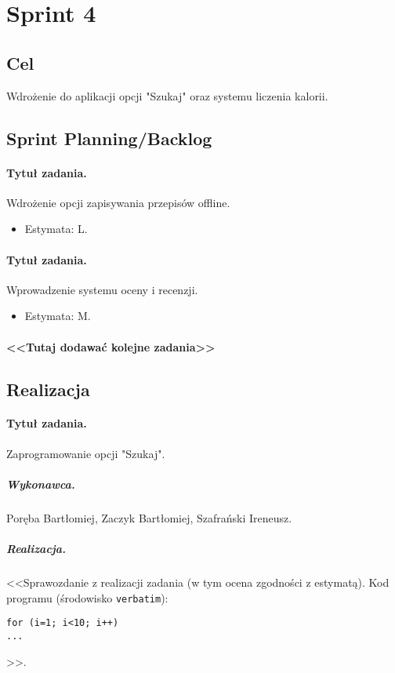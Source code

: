 \documentclass[a4paper]{article}
\begin{document}
\section{Sprint 4}

\subsection{Cel} Wdrożenie do aplikacji opcji "Szukaj" oraz systemu liczenia kalorii.

\subsection{Sprint Planning/Backlog}

\paragraph{Tytuł zadania.} Wdrożenie opcji zapisywania przepisów offline.
\begin{itemize}
	\item Estymata: L.
\end{itemize}

\paragraph{Tytuł zadania.} Wprowadzenie systemu oceny i recenzji.
\begin{itemize}
	\item Estymata: M.
\end{itemize}

\paragraph{<<Tutaj dodawać kolejne zadania>>}

\subsection{Realizacja}

\paragraph{Tytuł zadania.} Zaprogramowanie opcji "Szukaj".
\subparagraph{Wykonawca.} Poręba Bartłomiej, Zaczyk Bartłomiej, Szafrański Ireneusz.
\subparagraph{Realizacja.} <<Sprawozdanie z realizacji zadania (w tym ocena zgodności z estymatą). Kod programu (środowisko \texttt{verbatim}): \begin{verbatim}
for (i=1; i<10; i++)
...
\end{verbatim}>>.
\end{document}
